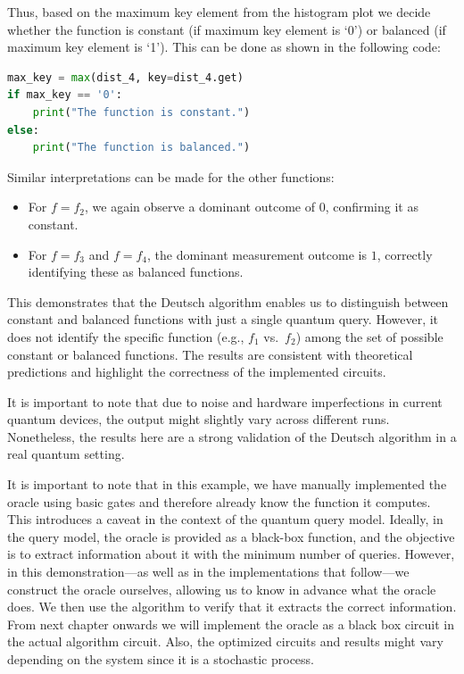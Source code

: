 Thus, based on the maximum key element from the histogram plot we decide whether the function is constant (if maximum key element is `0') or balanced (if maximum key element is `1'). This can be done as shown in the following code:
\begin{lstlisting}[language=Python]
max_key = max(dist_4, key=dist_4.get)
if max_key == '0':
    print("The function is constant.")
else:
    print("The function is balanced.")
\end{lstlisting}
Similar interpretations can be made for the other functions:
\begin{itemize}
    \item For $f = f_2$, we again observe a dominant outcome of $0$, confirming it as constant.
    \item For $f = f_3$ and $f = f_4$, the dominant measurement outcome is $1$, correctly identifying these as balanced functions.
\end{itemize}

This demonstrates that the Deutsch algorithm enables us to distinguish between constant and balanced functions with just a single quantum query. However, it does not identify the specific function (e.g., $f_1$ vs.\ $f_2$) among the set of possible constant or balanced functions. The results are consistent with theoretical predictions and highlight the correctness of the implemented circuits.

It is important to note that due to noise and hardware imperfections in current quantum devices, the output might slightly vary across different runs. Nonetheless, the results here are a strong validation of the Deutsch algorithm in a real quantum setting.

\begin{remark}
    It is important to note that in this example, we have manually implemented the oracle using basic gates and therefore already know the function it computes. This introduces a caveat in the context of the quantum query model. Ideally, in the query model, the oracle is provided as a black-box function, and the objective is to extract information about it with the minimum number of queries. However, in this demonstration—as well as in the implementations that follow—we construct the oracle ourselves, allowing us to know in advance what the oracle does. We then use the algorithm to verify that it extracts the correct information. From next chapter onwards we will implement the oracle as a black box circuit in the actual algorithm circuit. Also, the optimized circuits and results might vary depending on the system since it is a stochastic process.
\end{remark}



\chapterreferences

